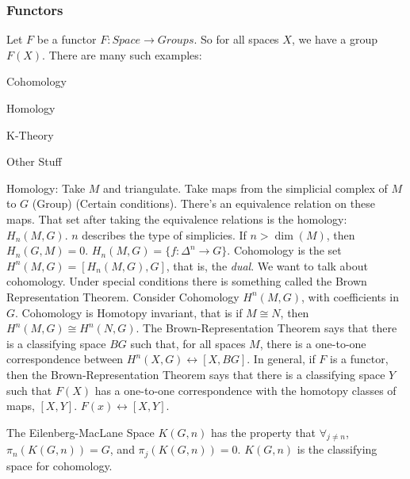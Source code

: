             \subsubsection{Functors}
                Let $F$ be a functor
                $F:\textit{Space}\rightarrow\textit{Groups}$.
                So for all spaces $X$, we have a group $F(X)$.
                There are many such examples:
                \begin{itemize}
                    \begin{multicols}{4}
                        \item Cohomology
                        \item Homology
                        \item K-Theory
                        \item Other Stuff
                    \end{multicols}
                \end{itemize}
                Homology: Take $M$ and triangulate. Take maps from the
                simplicial complex of $M$ to $G$ (Group) (Certain conditions).
                There's an equivalence relation on these maps. That set after
                taking the equivalence relations is the homology: $H_{n}(M,G)$.
                $n$ describes the type of simplicies. If $n>\dim(M)$, then
                $H_{n}(G,M)=0$. $H_{n}(M,G)=\{f:\Delta^{n}\rightarrow G\}$.
                Cohomology is the set $H^{n}(M,G)=[H_{n}(M,G),G]$, that is, the
                \textit{dual}. We want to talk about cohomology. Under special
                conditions there is something called the Brown Representation
                Theorem. Consider Cohomology $H^{n}(M,G)$, with coefficients in
                $G$. Cohomology is Homotopy invariant, that is if $M\cong{N}$,
                then $H^{n}(M,G)\cong H^{n}(N,G)$. The Brown-Representation
                Theorem says that there is a classifying space $BG$ such that,
                for all spaces $M$, there is a one-to-one correspondence between
                $H^{n}(X,G)\leftrightarrow[X,BG]$. In general, if $F$ is a
                functor, then the Brown-Representation Theorem says that there
                is a classifying space $Y$ such that $F(X)$ has a one-to-one
                correspondence with the homotopy classes of maps, $[X,Y]$.
                $F(x)\leftrightarrow[X,Y]$.
                \begin{example}
                    The Eilenberg-MacLane Space $K(G,n)$ has the property that
                    $\forall_{j\ne{n}}$, $\pi_{n}(K(G,n))=G$, and
                    $\pi_{j}(K(G,n))=0$. $K(G,n)$ is the classifying space for
                    cohomology.
                \end{example}
